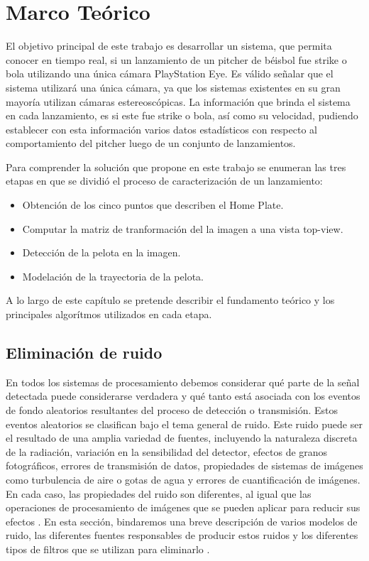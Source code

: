 \chapter{Marco Teórico}\label{chapter:theorical}

El objetivo principal de este trabajo es desarrollar un sistema, que permita conocer en tiempo real, si un lanzamiento de un pitcher de béisbol fue strike o bola utilizando una única cámara PlayStation Eye. Es válido señalar que el sistema utilizará una única cámara, ya que los sistemas existentes en su gran mayoría utilizan cámaras estereoscópicas. La información que brinda el sistema en cada lanzamiento, es si este fue strike o bola, así como su velocidad, pudiendo establecer con esta información varios datos estadísticos con respecto al comportamiento del pitcher luego de un conjunto de lanzamientos.

Para comprender la solución que propone en este trabajo se enumeran las tres etapas en que se dividió el proceso de caracterización de un lanzamiento:

\begin{itemize}
    \item Obtención de los cinco puntos que describen el Home Plate.
    \item Computar la matriz de tranformación del la imagen a una vista top-view.
    \item Detección de la pelota en la imagen.
    \item Modelación de la trayectoria de la pelota.
\end{itemize}

A lo largo de este capítulo se pretende describir el fundamento teórico y los principales algorítmos utilizados en cada etapa.

\section{Eliminación de ruido}

En todos los sistemas de procesamiento debemos considerar qué parte de la señal detectada puede considerarse verdadera y qué tanto está asociada con los eventos de fondo aleatorios resultantes del proceso de detección o transmisión. Estos eventos aleatorios se clasifican bajo el tema general de ruido. Este ruido puede ser el resultado de una amplia variedad de fuentes, incluyendo la naturaleza discreta de la radiación, variación en la sensibilidad del detector, efectos de granos fotográficos, errores de transmisión de datos, propiedades de sistemas de imágenes como turbulencia de aire o gotas de agua y errores de cuantificación de imágenes. En cada caso, las propiedades del ruido son diferentes, al igual que las operaciones de procesamiento de imágenes que se pueden aplicar para reducir sus efectos \cite{topic5}. En esta sección, bindaremos una breve descripción de varios modelos de ruido, las diferentes fuentes responsables de producir estos ruidos y los diferentes tipos de filtros que se utilizan para eliminarlo \cite{MandarMeghana}.

